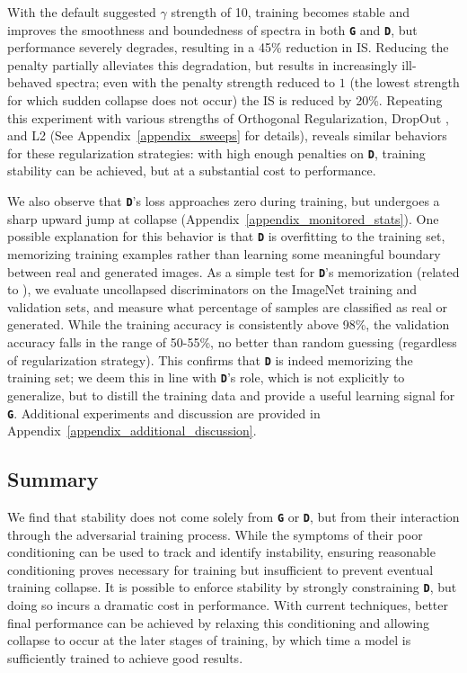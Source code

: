 \documentclass{article} %
\newcommand{\gen}{\textbf{\texttt{G}}}
\newcommand{\discr}{\textbf{\texttt{D}}}
\begin{document}
With the default suggested $\gamma$ strength of 10, training becomes stable and improves the smoothness and boundedness of spectra in both \gen{} and \discr{}, but performance severely degrades, resulting in a 45\% reduction in IS. Reducing the penalty partially alleviates this degradation, but results in increasingly ill-behaved spectra; even with the penalty strength reduced to $1$ (the lowest strength for which sudden collapse does not occur) the IS is reduced by 20\%.
Repeating this experiment with various strengths of Orthogonal Regularization, DropOut \citep{srivastava2014dropout}, and L2 (See Appendix~\ref{appendix_sweeps} for details), reveals similar behaviors for these regularization strategies: with high enough penalties on \discr{}, training stability can be achieved, but at a substantial cost to performance.



We also observe that \discr{}'s loss approaches zero during training, but undergoes a sharp upward jump at collapse (Appendix~\ref{appendix_monitored_stats}).
One possible explanation for this behavior is that \discr{} is overfitting to the training set, memorizing training examples rather than learning some meaningful boundary between real and generated images.  As a simple test for \discr{}'s memorization (related to \cite{gulrajani2017improved}), we evaluate uncollapsed discriminators on the ImageNet training and validation sets, and measure what percentage of samples are classified as real or generated. While the training accuracy is consistently above 98\%, the validation accuracy falls in the range of 50-55\%, no better than random guessing (regardless of regularization strategy). This confirms that \discr{} 
is indeed memorizing the training set;
we deem this in line with \discr{}'s role, which is not explicitly to generalize, but to distill the training data and provide a useful learning signal for \gen{}. Additional experiments and discussion are provided in Appendix~\ref{appendix_additional_discussion}.



\subsection{Summary}
We find that stability does not come solely from \gen{} or \discr{}, but from their interaction through the adversarial training process. While the symptoms of their poor conditioning can be used to track and identify instability, ensuring reasonable conditioning proves necessary for training but insufficient to prevent eventual training collapse. It is possible to enforce stability by strongly constraining \discr{}, but doing so incurs a dramatic cost in performance. With current techniques, better final performance can be achieved by relaxing this conditioning and allowing collapse to occur at the later stages of training, by which time a model is sufficiently trained to achieve good results.
\end{document}
